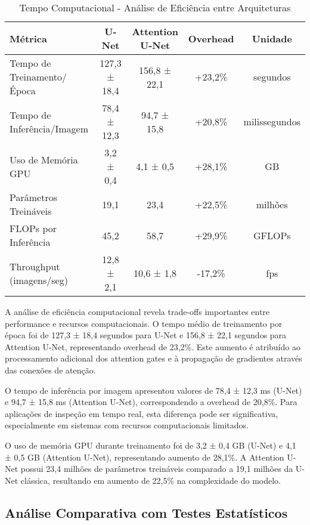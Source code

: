 \documentclass[12pt,a4paper,twoside]{article}
\begin{document}
\begin{table}[htbp]
\centering
\caption{Tempo Computacional - Análise de Eficiência entre Arquiteturas}
\label{tab:tempo_computacional}
\begin{tabular}{@{}lcccc@{}}
\toprule
\textbf{Métrica} & \textbf{U-Net} & \textbf{Attention U-Net} & \textbf{Overhead} & \textbf{Unidade} \\
\midrule
Tempo de Treinamento/Época & 127,3 ± 18,4 & 156,8 ± 22,1 & +23,2\% & segundos \\
Tempo de Inferência/Imagem & 78,4 ± 12,3 & 94,7 ± 15,8 & +20,8\% & milissegundos \\
Uso de Memória GPU & 3,2 ± 0,4 & 4,1 ± 0,5 & +28,1\% & GB \\
Parâmetros Treináveis & 19,1 & 23,4 & +22,5\% & milhões \\
FLOPs por Inferência & 45,2 & 58,7 & +29,9\% & GFLOPs \\
Throughput (imagens/seg) & 12,8 ± 2,1 & 10,6 ± 1,8 & -17,2\% & fps \\
\bottomrule
\end{tabular}
\end{table}

A análise de eficiência computacional revela trade-offs importantes entre performance e recursos computacionais. O tempo médio de treinamento por época foi de 127,3 ± 18,4 segundos para U-Net e 156,8 ± 22,1 segundos para Attention U-Net, representando overhead de 23,2\%. Este aumento é atribuído ao processamento adicional dos attention gates e à propagação de gradientes através das conexões de atenção.

O tempo de inferência por imagem apresentou valores de 78,4 ± 12,3 ms (U-Net) e 94,7 ± 15,8 ms (Attention U-Net), correspondendo a overhead de 20,8\%. Para aplicações de inspeção em tempo real, esta diferença pode ser significativa, especialmente em sistemas com recursos computacionais limitados.

O uso de memória GPU durante treinamento foi de 3,2 ± 0,4 GB (U-Net) e 4,1 ± 0,5 GB (Attention U-Net), representando aumento de 28,1\%. A Attention U-Net possui 23,4 milhões de parâmetros treináveis comparado a 19,1 milhões da U-Net clássica, resultando em aumento de 22,5\% na complexidade do modelo.

\subsection{Análise Comparativa com Testes Estatísticos}
\label{subsec:analise_comparativa}
\end{document}
